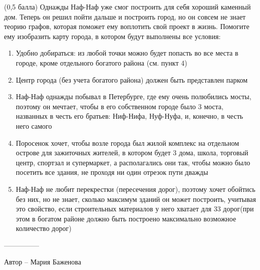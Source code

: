 \question
(0,5 балла) Однажды Наф-Наф уже смог построить для себя хороший каменный дом. Теперь он решил пойти дальше и построить город, но он совсем не знает теорию графов, которая поможет ему воплотить свой проект в жизнь. Помогите ему изобразить карту города, в котором будут выполнены все условия:

\begin{enumerate}
\item Удобно добираться: из любой точки можно будет попасть во все места в городе, кроме отдельного богатого района (см. пункт 4)
\item Центр города (без учета богатого района) должен быть представлен парком
\item Наф-Наф однажды побывал в Петербурге, где ему очень полюбились мосты, поэтому он мечтает, чтобы в его собственном городе было 3 моста, названных в честь его братьев: Ниф-Нифа, Нуф-Нуфа, и, конечно, в честь него самого
\item Поросенок хочет, чтобы возле города был жилой комплекс на отдельном острове для зажиточных жителей, в котором будет 3 дома, школа, торговый центр, спортзал и супермаркет, а располагались они так, чтобы можно было посетить все здания, не проходя ни один отрезок пути дважды
\item Наф-Наф не любит перекрестки (пересечения дорог), поэтому хочет обойтись без них, но не знает, сколько максимум зданий он может построить, учитывая это свойство, если строительных материалов у него хватает для 33 дорог(при этом в богатом районе должно быть построено максимально возможное количество дорог)
\end{enumerate}

---------------

Автор -- Мария Баженова

